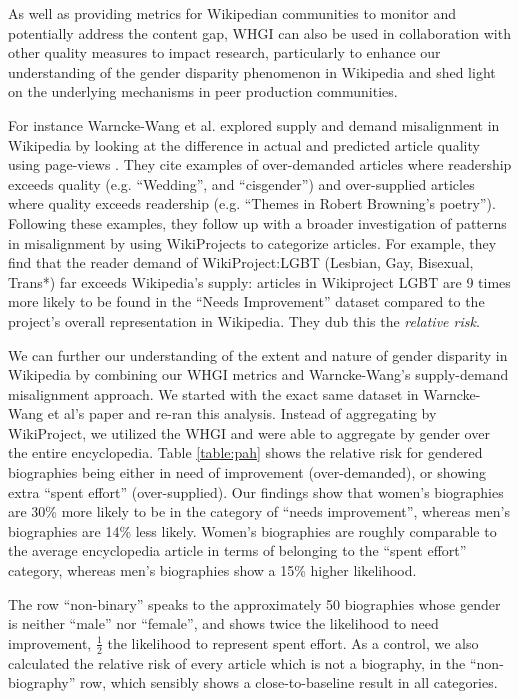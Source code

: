 \documentclass{sig-alternate-05-2015}
\begin{document}
As well as providing metrics for Wikipedian communities to monitor and potentially address the content gap, WHGI can also be used in collaboration with other quality measures to impact research, particularly to enhance our understanding of the gender disparity phenomenon in Wikipedia and shed light on the underlying mechanisms in peer production communities.

 For instance Warncke-Wang et al. explored supply and demand misalignment in Wikipedia by looking at the difference in actual and predicted article quality using page-views \cite{warncke-wang_misalignment_2015}. They cite examples of over-demanded articles where readership exceeds quality (e.g. ``Wedding'', and ``cisgender'') and over-supplied articles where quality exceeds readership (e.g. ``Themes in Robert Browning's poetry''). Following these examples, they follow up with a broader investigation of patterns in misalignment by using WikiProjects to categorize articles. For example, they find that the reader demand of WikiProject:LGBT (Lesbian, Gay, Bisexual, Trans*) far exceeds Wikipedia's supply: articles in Wikiproject LGBT are 9 times more likely to be found in the ``Needs Improvement'' dataset compared to the project's overall representation in Wikipedia. They dub this the \textit{relative risk}\cite{davies_when_1998}.

We can further our understanding of the extent and nature of gender disparity in Wikipedia by combining our WHGI metrics and Warncke-Wang's supply-demand misalignment approach. We started with the exact same dataset in Warncke-Wang et al's paper and re-ran this analysis. Instead of aggregating by WikiProject, we utilized the WHGI and were able to aggregate by gender over the entire encyclopedia. Table \ref{table:pah} shows the relative risk for gendered biographies being either in need of improvement (over-demanded), or showing extra ``spent effort'' (over-supplied). Our findings show that women's biographies are 30\% more likely to be in the category of ``needs improvement'', whereas men's biographies are 14\% less likely. Women's biographies are roughly comparable to the average encyclopedia article in terms of belonging to the ``spent effort'' category, whereas men's biographies show a 15\% higher likelihood.

The row ``non-binary'' speaks to the approximately 50 biographies whose gender is neither ``male'' nor ``female'', and shows twice the likelihood to need improvement, $\frac{1}{2}$ the likelihood to represent spent effort. As a control, we also calculated the relative risk of every article which is not a biography, in the ``non-biography'' row, which sensibly shows a close-to-baseline result in all categories. 
\end{document}
